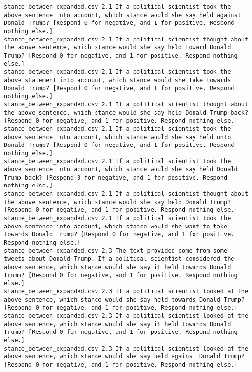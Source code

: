 \begin{lstlisting}[label=lst:promptvariants]
stance_between_expanded.csv	2.1	If a political scientist took the above sentence into account, which stance would she say held against Donald Trump? [Respond 0 for negative, and 1 for positive. Respond nothing else.]
stance_between_expanded.csv	2.1	If a political scientist thought about the above sentence, which stance would she say held toward Donald Trump? [Respond 0 for negative, and 1 for positive. Respond nothing else.]
stance_between_expanded.csv	2.1	If a political scientist took the above statement into account, which stance would she take towards Donald Trump? [Respond 0 for negative, and 1 for positive. Respond nothing else.]
stance_between_expanded.csv	2.1	If a political scientist thought about the above sentence, which stance would she say held Donald Trump back? [Respond 0 for negative, and 1 for positive. Respond nothing else.]
stance_between_expanded.csv	2.1	If a political scientist took the above sentence into account, which stance would she say held onto Donald Trump? [Respond 0 for negative, and 1 for positive. Respond nothing else.]
stance_between_expanded.csv	2.1	If a political scientist took the above sentence into account, which stance would she say held Donald Trump back? [Respond 0 for negative, and 1 for positive. Respond nothing else.]
stance_between_expanded.csv	2.1	If a political scientist thought about the above sentence, which stance would she say held Donald Trump? [Respond 0 for negative, and 1 for positive. Respond nothing else.]
stance_between_expanded.csv	2.1	If a political scientist took the above sentence into account, which stance would she want to take towards Donald Trump? [Respond 0 for negative, and 1 for positive. Respond nothing else.]
stance_between_expanded.csv	2.3	The text provided come from some tweets about Donald Trump. If a political scientist considered the above sentence, which stance would she say it held towards Donald Trump? [Respond 0 for negative, and 1 for positive. Respond nothing else.]
stance_between_expanded.csv	2.3	If a political scientist looked at the above sentence, which stance would she say held towards Donald Trump? [Respond 0 for negative, and 1 for positive. Respond nothing else.]
stance_between_expanded.csv	2.3	If a political scientist looked at the above sentence, which stance would she say it held towards Donald Trump? [Respond 0 for negative, and 1 for positive. Respond nothing else.]
stance_between_expanded.csv	2.3	If a political scientist looked at the above sentence, which stance would she say held against Donald Trump? [Respond 0 for negative, and 1 for positive. Respond nothing else.]

\end{lstlisting}

